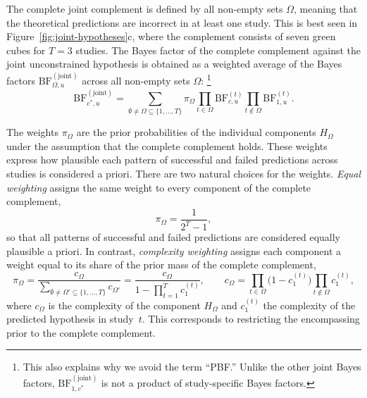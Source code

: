 \documentclass[letterpaper,11pt,oneside]{article}
\begin{document}
The complete joint complement is defined by all non-empty sets $\Omega$, meaning that the theoretical predictions are incorrect in at least one study. This is best seen in Figure~\ref{fig:joint-hypotheses}c, where the complement consists of seven green cubes for $T=3$ studies. The Bayes factor of the complete complement against the joint unconstrained hypothesis is obtained as a weighted average of the Bayes factors
$\mathrm{BF}^{(\text{joint})}_{\Omega,u}$ across all non-empty sets
$\Omega$:
    \footnote{This also explains why we avoid the term ``PBF.'' Unlike the other joint Bayes factors, $\mathrm{BF}^{(\text{joint})}_{1,c^*}$ is not a product of study-specific Bayes factors.}
\begin{equation}
\label{eq:bf-cstar-u-joint}
\mathrm{BF}^{(\text{joint})}_{c^*,u} =
\sum_{\emptyset\neq\Omega\subseteq\{1,\ldots,T\}} \pi_\Omega
\prod_{t\in\Omega}\mathrm{BF}^{(t)}_{c,u}\prod_{t\notin\Omega}\mathrm{BF}^{(t)}_{1,u}.
\end{equation}

The weights $\pi_\Omega$ are the prior probabilities of the individual components $H_\Omega$ under the assumption that the complete complement holds. These
weights express how plausible each pattern of successful and failed predictions across studies is
considered a priori. There are two natural choices for the weights.
\textit{Equal weighting} assigns the same weight to every component of the complete complement,
  \begin{equation}
  \pi_\Omega = \frac{1}{2^T-1},
  \end{equation}
so that all patterns of successful and failed predictions are considered equally plausible a priori.
In contrast, \textit{complexity weighting} assigns each component a weight equal to its share of the prior mass of the complete complement,
  \begin{equation}
  \pi_\Omega
  = \frac{c_\Omega}{\sum_{\emptyset\neq\Omega'\subseteq\{1,\dots,T\}} c_{\Omega'}}
  = \frac{c_\Omega}{1-\prod_{t=1}^{T} c_1^{(t)}},
  \qquad
  c_\Omega = \prod_{t\in\Omega}\bigl(1-c_1^{(t)}\bigr)\prod_{t\notin\Omega} c_1^{(t)},
  \end{equation}
where $c_\Omega$ is the complexity of the component $H_\Omega$ and $c_1^{(t)}$ the complexity of the predicted hypothesis in study~$t$. This corresponds to restricting the encompassing prior to the complete complement.
\end{document}
